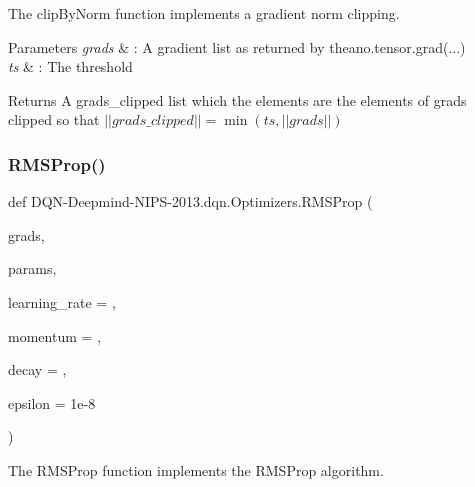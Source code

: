 The clip\+By\+Norm function implements a gradient norm clipping. 


\begin{DoxyParams}{Parameters}
{\em grads} & \+: A gradient list as returned by theano.\+tensor.\+grad(...) \\
\hline
{\em ts} & \+: The threshold\\
\hline
\end{DoxyParams}
\begin{DoxyReturn}{Returns}
A grads\+\_\+clipped list which the elements are the elements of \textquotesingle{}grads\textquotesingle{} clipped so that $||grads\_clipped|| = \min(ts, ||grads||)$ 
\end{DoxyReturn}
\hypertarget{namespaceDQN-Deepmind-NIPS-2013_1_1dqn_1_1Optimizers_a83bf1e32b34c7f7e9c7a8755969513ed}{}\label{namespaceDQN-Deepmind-NIPS-2013_1_1dqn_1_1Optimizers_a83bf1e32b34c7f7e9c7a8755969513ed} 
\subsubsection{\texorpdfstring{R\+M\+S\+Prop()}{RMSProp()}}
{\footnotesize\ttfamily def D\+QN-\/Deepmind-\/N\+I\+PS-\/2013.dqn.\+Optimizers.\+R\+M\+S\+Prop (\begin{DoxyParamCaption}\item[{}]{grads,  }\item[{}]{params,  }\item[{}]{learning\+\_\+rate = {},  }\item[{}]{momentum = {},  }\item[{}]{decay = {},  }\item[{}]{epsilon = {\ttfamily 1e-\/8} }\end{DoxyParamCaption})}



The R\+M\+S\+Prop function implements the R\+M\+S\+Prop algorithm. 

